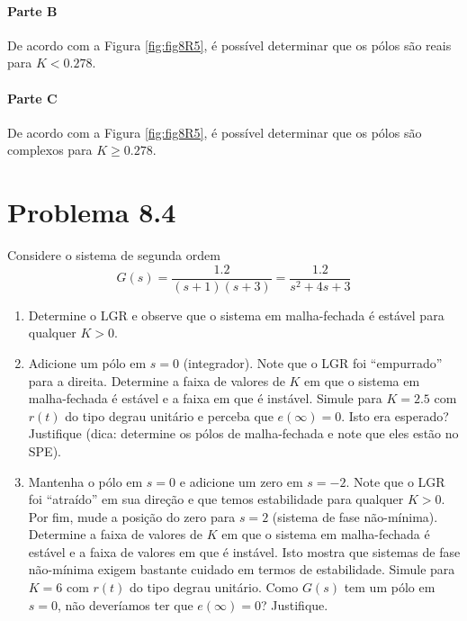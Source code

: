\documentclass[
]{book}
\providecommand{\tightlist}{%
  \setlength{\itemsep}{0pt}\setlength{\parskip}{0pt}}
\theoremstyle{definition}
\theoremstyle{definition}
\theoremstyle{definition}
\theoremstyle{remark}
\begin{document}
\hypertarget{parte-b-10}{%
\paragraph{Parte B}\label{parte-b-10}}

De acordo com a Figura \ref{fig:fig8R5}, é possível determinar que os pólos são reais para \(K < 0.278\).

\hypertarget{parte-c-6}{%
\paragraph{Parte C}\label{parte-c-6}}

De acordo com a Figura \ref{fig:fig8R5}, é possível determinar que os pólos são complexos para \(K \geq 0.278\).

\hypertarget{problema-8.4}{%
\section*{Problema 8.4}\label{problema-8.4}}

Considere o sistema de segunda ordem
\[
G(s) = \frac{1.2}{(s+1)(s+3)} = \frac{1.2}{s^2+4s+3}
\]

\begin{enumerate}
\def\labelenumi{\alph{enumi}.}
\tightlist
\item
  Determine o LGR e observe que o sistema em malha-fechada é estável para qualquer \(K>0\).
\item
  Adicione um pólo em \(s=0\) (integrador). Note que o LGR foi ``empurrado'' para a direita. Determine a faixa de valores de \(K\) em que o sistema em malha-fechada é estável e a faixa em que é instável. Simule para \(K = 2.5\) com \(r(t)\) do tipo degrau unitário e perceba que \(e(\infty) = 0\). Isto era esperado? Justifique (dica: determine os pólos de malha-fechada e note que eles estão no SPE).
\item
  Mantenha o pólo em \(s=0\) e adicione um zero em \(s=-2\). Note que o LGR foi ``atraído'' em sua direção e que temos estabilidade para qualquer \(K>0\). Por fim, mude a posição do zero para \(s=2\) (sistema de fase não-mínima). Determine a faixa de valores de \(K\) em que o sistema em malha-fechada é estável e a faixa de valores em que é instável. Isto mostra que sistemas de fase não-mínima exigem bastante cuidado em termos de estabilidade. Simule para \(K=6\) com \(r(t)\) do tipo degrau unitário. Como \(G(s)\) tem um pólo em \(s=0\), não deveríamos ter que \(e(\infty) = 0\)? Justifique.
\end{enumerate}
\end{document}
